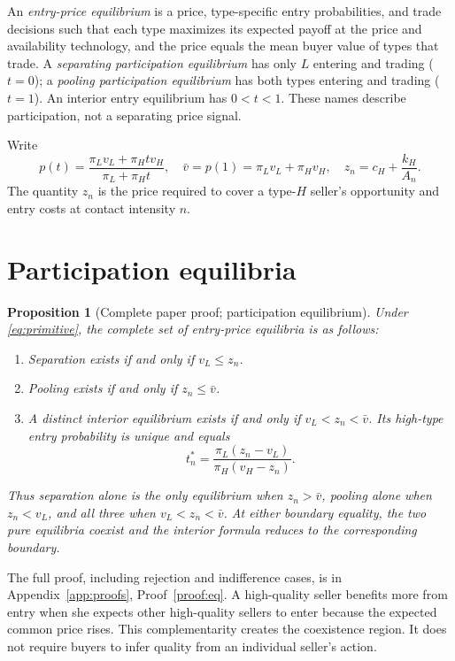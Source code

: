 \documentclass[11pt]{article}
\newtheorem{proposition}{Proposition}
\begin{document}
An \emph{entry-price equilibrium} is a price, type-specific entry probabilities, and trade decisions such that each type maximizes its expected payoff at the price and availability technology, and the price equals the mean buyer value of types that trade. A \emph{separating participation equilibrium} has only $L$ entering and trading ($t=0$); a \emph{pooling participation equilibrium} has both types entering and trading ($t=1$). An interior entry equilibrium has $0<t<1$. These names describe participation, not a separating price signal.

Write
\begin{equation}\label{eq:pz}
 p(t)=\frac{\pi_Lv_L+\pi_Ht v_H}{\pi_L+\pi_Ht},\quad
 \bar v=p(1)=\pi_Lv_L+\pi_Hv_H,\quad
 z_n=c_H+\frac{k_H}{A_n}.
\end{equation}
The quantity $z_n$ is the price required to cover a type-$H$ seller's opportunity and entry costs at contact intensity $n$.

\section{Participation equilibria}\label{sec:eq}

\begin{proposition}[Complete paper proof; participation equilibrium]\label{prop:eq}
Under \eqref{eq:primitive}, the complete set of entry-price equilibria is as follows:
\begin{enumerate}
\item Separation exists if and only if $v_L\leq z_n$.
\item Pooling exists if and only if $z_n\leq\bar v$.
\item A distinct interior equilibrium exists if and only if $v_L<z_n<\bar v$. Its high-type entry probability is unique and equals
\begin{equation}\label{eq:tstar}
 t_n^*=\frac{\pi_L(z_n-v_L)}{\pi_H(v_H-z_n)}.
\end{equation}
\end{enumerate}
Thus separation alone is the only equilibrium when $z_n>\bar v$, pooling alone when $z_n<v_L$, and all three when $v_L<z_n<\bar v$. At either boundary equality, the two pure equilibria coexist and the interior formula reduces to the corresponding boundary.
\end{proposition}
The full proof, including rejection and indifference cases, is in Appendix~\ref{app:proofs}, Proof~\ref{proof:eq}. A high-quality seller benefits more from entry when she expects other high-quality sellers to enter because the expected common price rises. This complementarity creates the coexistence region. It does not require buyers to infer quality from an individual seller's action.
\end{document}

